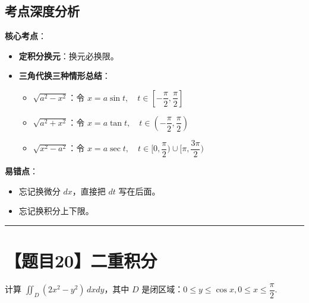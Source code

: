 \documentclass[UTF8,10pt]{ctexart}
\newenvironment{redenv}{\color{red}}{}
\newenvironment{conceptbox}{%
    \begin{tcolorbox}[colback=red!5, colframe=red!50!black, title=概念解析, fonttitle=\bfseries, top=2pt, bottom=2pt, left=2pt, right=2pt]
}{%
    \end{tcolorbox}
}
\newcommand{\problemrule}{\par\filbreak\noindent\rule{\textwidth}{1.5pt}\vspace{-0.5em}}
\begin{document}
\begin{redenv}
\subsection*{考点深度分析}
\begin{conceptbox}
\textbf{核心考点}：
\begin{itemize}
    \item \textbf{定积分换元}：换元必换限。
    \item \textbf{三角代换三种情形总结}：
    \begin{itemize}
        \item $\sqrt{a^2 - x^2}$：令 $x = a\sin t, \quad t \in [-\dfrac{\pi}{2}, \dfrac{\pi}{2}]$
        \item $\sqrt{a^2 + x^2}$：令 $x = a\tan t, \quad t \in (-\dfrac{\pi}{2}, \dfrac{\pi}{2})$
        \item $\sqrt{x^2 - a^2}$：令 $x = a\sec t, \quad t \in [0, \dfrac{\pi}{2}) \cup [\pi, \dfrac{3\pi}{2})$
    \end{itemize}
\end{itemize}
\textbf{易错点}：
\begin{itemize}
    \item 忘记换微分 $dx$，直接把 $dt$ 写在后面。
    \item 忘记换积分上下限。
\end{itemize}
\end{conceptbox}
\end{redenv}

\problemrule
\section*{【题目20】二重积分}
计算 $\iint_{D} (2x^2 - y^2)\, dxdy$，其中 $D$ 是闭区域：$0 \le y \le \cos x, 0 \le x \le \dfrac{\pi}{2}$.
\end{document}
